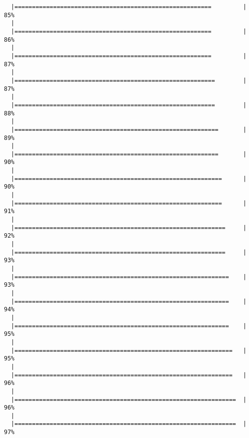 \begin{knitrout}
\begin{kframe}
\begin{verbatim}
  |========================================================         |  85%
  |                                                                       
  |========================================================         |  86%
  |                                                                       
  |========================================================         |  87%
  |                                                                       
  |=========================================================        |  87%
  |                                                                       
  |=========================================================        |  88%
  |                                                                       
  |==========================================================       |  89%
  |                                                                       
  |==========================================================       |  90%
  |                                                                       
  |===========================================================      |  90%
  |                                                                       
  |===========================================================      |  91%
  |                                                                       
  |============================================================     |  92%
  |                                                                       
  |============================================================     |  93%
  |                                                                       
  |=============================================================    |  93%
  |                                                                       
  |=============================================================    |  94%
  |                                                                       
  |=============================================================    |  95%
  |                                                                       
  |==============================================================   |  95%
  |                                                                       
  |==============================================================   |  96%
  |                                                                       
  |===============================================================  |  96%
  |                                                                       
  |===============================================================  |  97%

\end{verbatim}
\end{kframe}
\end{knitrout}
